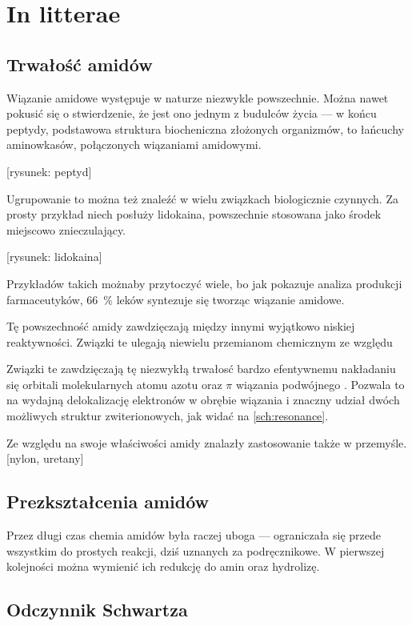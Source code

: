 \chapter{In litterae}

\section{Trwałość amidów}
Wiązanie amidowe występuje w naturze niezwykle powszechnie.
Można nawet pokusić się o stwierdzenie, że jest ono jednym z budulców życia ---
w końcu peptydy, podstawowa struktura biocheniczna złożonych organizmów,
to łańcuchy aminowkasów, połączonych wiązaniami amidowymi.

{\color{wongpurple} [rysunek: peptyd]}  %

Ugrupowanie to można też znaleźć w wielu związkach biologicznie czynnych.
Za prosty przykład niech posłuży lidokaina, powszechnie stosowana jako środek miejscowo znieczulający.

{\color{wongpurple} [rysunek: lidokaina]}  %

Przykładów takich możnaby przytoczyć wiele, bo jak pokazuje analiza produkcji farmaceutyków,
\SI{66}{\percent} leków syntezuje się tworząc wiązanie amidowe\autocite{carey06}.

Tę powszechność amidy zawdzięczają między innymi wyjątkowo niskiej reaktywności.
Związki te ulegają niewielu przemianom chemicznym ze względu  %

Związki te zawdzięczają tę niezwykłą trwałosć bardzo efentywnemu nakładaniu się orbitali molekularnych atomu azotu oraz $\pi$ wiązania podwójnego .
Pozwala to na wydajną delokalizację elektronów w obrębie wiązania i znaczny udział dwóch możliwych struktur zwiterionowych, jak widać na \autoref{sch:resonance}.

Ze względu na swoje właściwości amidy znalazły zastosowanie także w przemyśle.
{\color{wongpurple} [nylon, uretany]}  %

\section{Prezkształcenia amidów}
Przez długi czas chemia amidów była raczej uboga ---
ograniczała się przede wszystkim do prostych reakcji, dziś uznanych za podręcznikowe.
W pierwszej kolejności można wymienić ich redukcję do amin oraz hydrolizę.

\section{Odczynnik Schwartza}
